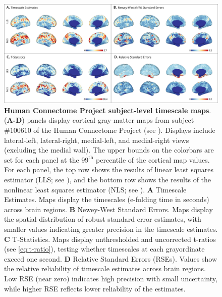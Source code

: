 \documentclass[latex/main.tex]{subfiles}
\begin{document}
\begin{figure}[H]
    \centering
    \includegraphics[width=1\textwidth]{latex/figures/fig04-hcp1.png} 
    \caption{
    \textbf{Human Connectome Project subject-level timescale maps}.
    (\textbf{A-D}) panels display cortical gray-matter maps from subject $\# 100610$ of the Human Connectome Project (see ). Displays include lateral-left, lateral-right, medial-left, and medial-right views (excluding the medial wall). The upper bounds on the colorbars are set for each panel at the $99^\text{th}$ percentile of the cortical map values. For each panel, the top row shows the results of linear least squares estimator (LLS; see ), and the bottom row shows the results of the nonlinear least squares estimator (NLS; see ). 
    \textbf{A} Timescale Estimates. Maps display the timescales (e-folding time in seconds) across brain regions. 
    \textbf{B} Newey-West Standard Errors. Maps display the spatial distribution of robust standard error estimates, with smaller values indicating greater precision in the timescale estimates. 
    \textbf{C} T-Statistics. Maps display unthresholded and uncorrected t-ratios (see \eqref{eq:t-ratio}), testing whether timescales at each grayordinate exceed one second. 
    \textbf{D} Relative Standard Errors (RSEs). Values show the relative reliability of timescale estimates across brain regions. Low RSE (near zero) indicates high precision with small uncertainty, while higher RSE reflects lower reliability of the estimates.
    }
    \label{fig:map-hcp1}
\end{figure}
\end{document}
